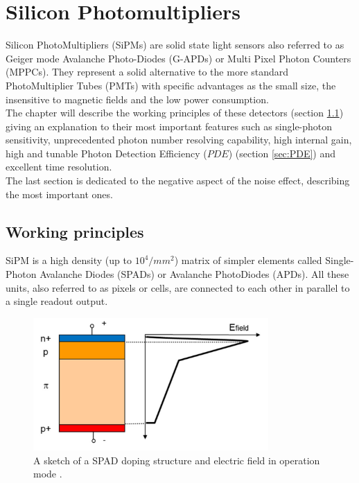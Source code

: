 \chapter{Silicon Photomultipliers}
Silicon PhotoMultipliers (SiPMs) are solid state light sensors also referred to as Geiger mode Avalanche Photo-Diodes (G-APDs) or Multi Pixel Photon Counters (MPPCs). They represent a solid alternative to the more standard PhotoMultiplier Tubes (PMTs) with specific advantages as the small size, the insensitive to magnetic fields and the low power consumption.\\

The chapter will describe the working principles of these detectors (section \ref{sec:SiPM_work}) giving an explanation to their most important features such as single-photon sensitivity, unprecedented photon number resolving capability, high internal gain, high and tunable Photon Detection Efficiency ($PDE$) (section \ref{sec:PDE}) and excellent time resolution.\\
The last section is dedicated to the negative aspect of the noise effect, describing the most important ones.\\ 

\section{Working principles}\label{sec:SiPM_work}
SiPM is a high density (up to $10^4/mm^2$) matrix of simpler elements called Single-Photon Avalanche Diodes (SPADs) or Avalanche PhotoDiodes (APDs). All these units, also referred to as pixels or cells, are connected to each other in parallel to a single readout output.\\

\begin{figure}
	\centering
	\includegraphics[width=0.8\textwidth]{IMG/Cap3/APD_struc.png}
	\caption{A sketch of a SPAD doping structure and electric field in operation mode \cite{electrics}.}
	\label{fig:APD_struc}
\end{figure}

